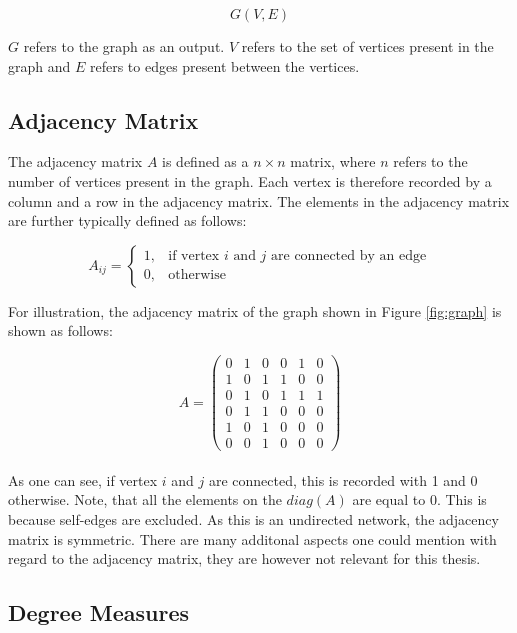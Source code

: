 	\begin{equation}
		G(V,E)
	\end{equation}

	\noindent $G$ refers to the graph as an output. $V$ refers to the set of 
	vertices present in the graph and $E$ refers to edges present between the 
	vertices. \\

	\subsection{Adjacency Matrix}

	The adjacency matrix $A$ is defined as a $n \times n$ matrix, where $n$ refers
	to the number of vertices present in the graph. Each vertex is therefore
	recorded by a column and a row in the adjacency matrix. The elements in the
	adjacency matrix are further typically defined as follows:

	\begin{equation}
		A_{ij} = 
			\begin{cases}
				1, & \text{if vertex $i$ and $j$ are connected by an edge} \\
				0, & \text{otherwise}
			\end{cases}
	\end{equation}
	
	\noindent For illustration, the adjacency matrix of the graph shown in Figure
	\ref{fig:graph} is shown as follows:

	\[ A = 
	\begin{pmatrix}
		0 & 1 & 0 & 0 & 1 & 0 \\
		1 & 0 & 1 & 1 & 0 & 0 \\
		0 & 1 & 0 & 1 & 1 & 1 \\
		0 & 1 & 1 & 0 & 0 & 0 \\
		1 & 0 & 1 & 0 & 0 & 0 \\
		0 & 0 & 1 & 0 & 0 & 0  
	\end{pmatrix}
	\] \\
	
	\noindent As one can see, if vertex $i$ and $j$ are connected, this is recorded with
	1 and 0 otherwise. Note, that all the elements on the $diag(A)$ are equal
	to 0. This is because self-edges are excluded. As this is an undirected
	network, the adjacency matrix is symmetric. There are many additonal
	aspects one could mention with regard to the adjacency matrix, they are
	however not relevant for this thesis.

	\subsection{Degree Measures}

